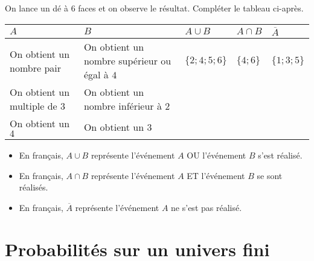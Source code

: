 \documentclass{article}
\begin{document}
\begin{example}
On lance un dé à 6 faces et on observe le résultat. Compléter le tableau ci-après.
\begin{center}
\begin{tabular}{|*{5}{C{0.15\textwidth}|}}
\hline
$A$ & $B$ & $A \cup B$ & $A \cap B$ & $\overbar{A}$\\
\hline
On obtient un nombre pair & On obtient un nombre supérieur ou égal à $4$ & $\{2;4;5;6\}$ & $\{4;6\}$ & $\{1;3;5\}$\\
\hline
On obtient un multiple de $3$ & On obtient un nombre inférieur à $2$ & & & \\
\hline
On obtient un $4$ & On obtient un $3$ & & & \\
\hline
\end{tabular}
\end{center}
\end{example}
\vspace*{1cm}
\begin{remark}
\begin{itemize}
\item En français, $A \cup B$ représente \og l'événement $A$ OU l'événement $B$ s'est réalisé.\fg
\item En français, $A \cap B$ représente \og l'événement $A$ ET l'événement $B$ se sont réalisés.\fg
\item En français, $\overbar{A}$ représente \og l'événement $A$ ne s'est pas réalisé.\fg
\end{itemize}
\end{remark}
\newpage
\section{Probabilités sur un univers fini}
\end{document}
